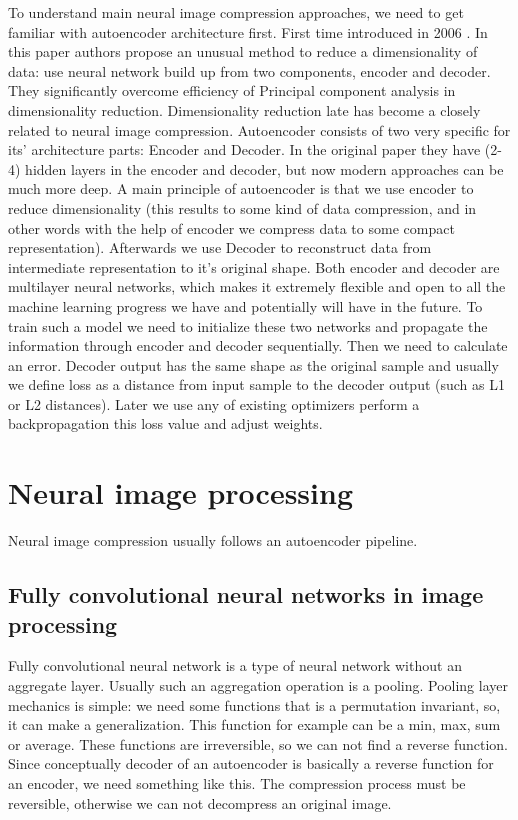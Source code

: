 To understand main neural image compression approaches, we need to get familiar with autoencoder architecture first. First time introduced in 2006 \cite{Autoencoder_2006}. In this paper authors propose an unusual method to reduce a dimensionality of data: use neural network build up from two components, encoder and decoder. They significantly overcome efficiency of Principal component analysis \cite{pca} in dimensionality reduction. Dimensionality reduction late has become a closely related to neural image compression. Autoencoder consists of two very specific for its' architecture parts: Encoder and Decoder. In the original paper they have (2-4) hidden layers in the encoder and decoder, but now modern approaches can be much more deep. A main principle of autoencoder is that we use encoder to reduce dimensionality (this results to some kind of data compression, and in other words with the help of encoder we compress data to some compact representation). Afterwards we use Decoder to reconstruct data from intermediate representation to it's original shape. Both encoder and decoder are multilayer neural networks, which makes it extremely flexible and open to all the machine learning progress we have and potentially will have in the future. To train such a model we need to initialize these two networks and propagate the information through encoder and decoder sequentially. Then we need to calculate an error. Decoder output has the same shape as the original sample and usually we define loss as a distance from input sample to the decoder output (such as L1 or L2 distances). Later we use any of existing optimizers perform a backpropagation this loss value and adjust weights.

\chapter{Neural image processing}

Neural image compression usually follows an autoencoder pipeline.

\section{Fully convolutional neural networks in image processing}

Fully convolutional neural network is a type of neural network without an aggregate layer. Usually such an aggregation operation is a pooling. Pooling layer mechanics is simple: we need some functions that is a permutation invariant, so, it can make a generalization. This function for example can be a min, max, sum or average. These functions are irreversible, so we can not find a reverse function. Since conceptually decoder of an autoencoder is basically a reverse function for an encoder, we need something like this. The compression process must be reversible, otherwise we can not decompress an original image.

